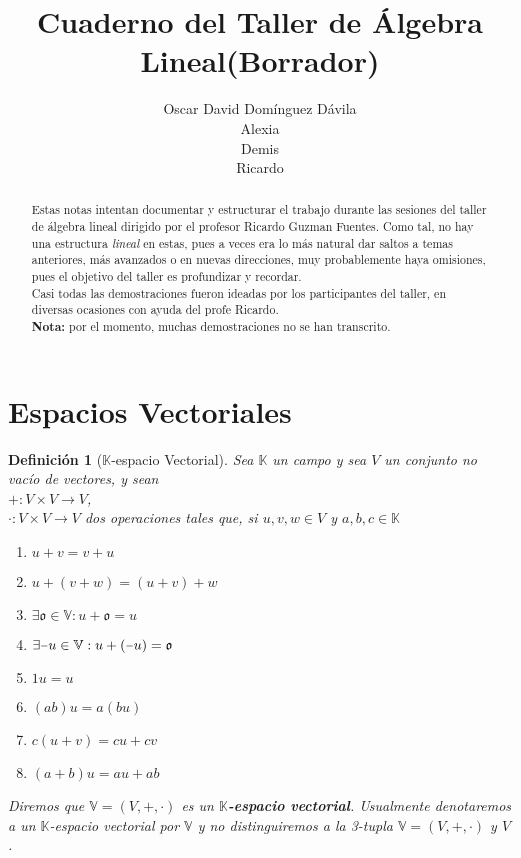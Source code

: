 \documentclass[14pt]{extarticle} %
\title{Cuaderno del Taller de Álgebra Lineal(Borrador)}
\author{Oscar David Domínguez Dávila \\
        Alexia \\
        Demis \\
        Ricardo \\
        }
\newtheorem{definicion}{Definición}
\theoremstyle{problemastyle} %
\newcommand{\kampo}{\mathbb{K}}
\newcommand{\kev}{$\kampo$-espacio vectorial}
\newcommand{\cero}{\mathfrak{o}} %
\newcommand{\minus}{\scalebox{0.75}[1.0]{$-$}} %
\newcommand{\evV}{\mathbb{V}} %
\begin{document}
\maketitle

\begin{abstract}
Estas notas intentan documentar y estructurar el trabajo durante las sesiones del taller de álgebra lineal dirigido por el profesor Ricardo Guzman Fuentes. Como tal, no hay una estructura \textit{lineal} en estas, pues a veces era lo más natural dar saltos a temas anteriores, más avanzados o en nuevas direcciones, muy probablemente haya omisiones, pues el objetivo del taller es profundizar y recordar.\\ Casi todas las demostraciones fueron ideadas por los participantes del taller, en diversas ocasiones con ayuda del profe Ricardo.\\
\textbf{Nota:} por el momento, muchas demostraciones no se han transcrito.
\end{abstract}

\section{Espacios Vectoriales}

\begin{definicion}[$\kampo$-espacio Vectorial]
     Sea $\kampo$ un campo y sea $V$ un conjunto no vacío de vectores,  y sean\\
     $ + : V \times V \rightarrow V$,\\
     $ \cdot : V  \times V \rightarrow V $ dos operaciones tales que, si $u,v,w \in V$ y $a,b,c \in \kampo$
    
     \begin{enumerate}
         \item $u+v=v+u$
         \item $u+(v+w)=(u+v)+w$
         \item $\exists \cero \in \evV : u + \cero = u$
         \item $\exists \minus u\in \evV : u + ( \minus u) = \cero$
         \item $1u =u$
         \item $(ab)u = a(bu)$
         \item $c(u+v)=cu+cv$
         \item $(a+b)u=au+ab$
     \end{enumerate}
    Diremos que $\evV  = (V,+,\cdot)$ es un \textbf{$\kampo$-espacio vectorial}.
    Usualmente denotaremos a un  \kev \; por $\evV$ y no distinguiremos  a la 3-tupla $\evV= (V,+,\cdot )$ y $V$.
    
\end{definicion}
\end{document}
